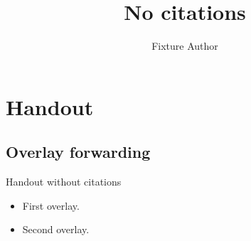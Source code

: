 \documentclass[language=english,handout]{campusbeamer}
\title{No citations}
\author{Fixture Author}
\begin{document}
\section{Handout}
\subsection{Overlay forwarding}
\begin{frame}{Handout without citations}
  \begin{itemize}
    \item<1-> First overlay.
    \item<2-> Second overlay.
  \end{itemize}
\end{frame}
\end{document}
